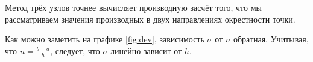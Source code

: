\documentclass{article}
\begin{document}
Метод трёх узлов точнее вычисляет производную засчёт того, что мы рассматриваем
значения производных в двух направлениях окрестности точки.

Как можно заметить на графике \ref{fig:dev}, зависимость $\sigma$ от $n$ обратная.
Учитывая, что $n = \frac{b-a}{h}$, следует, что $\sigma$ линейно зависит от $h$.
\end{document}
